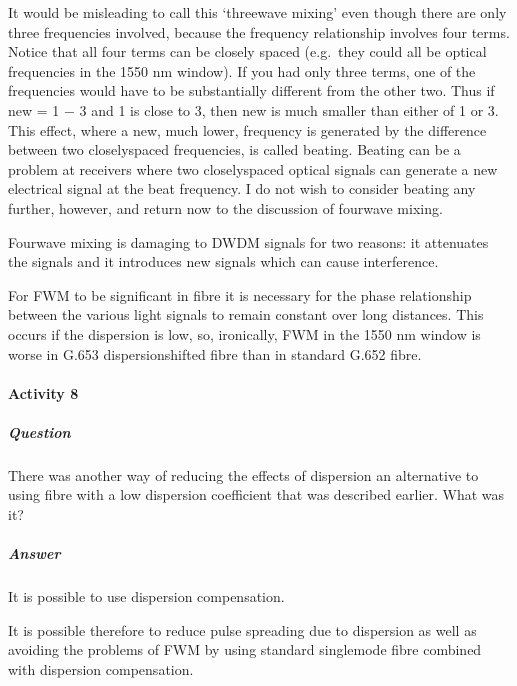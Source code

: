 \documentclass[letterpaper,10pt,english]{sphinxmanual}
\begin{document}
It would be misleading to call this ‘three\sphinxhyphen{}wave mixing’ even though there are only three frequencies involved, because the frequency relationship involves four terms. Notice that all four terms can be closely spaced (e.g. they could all be optical frequencies in the 1550 nm window). If you had only three terms, one of the frequencies would have to be substantially different from the other two. Thus if new = 1 − 3 and 1 is close to 3, then new is much smaller than
either of 1 or 3. This effect, where a new, much lower, frequency is generated by the difference between two closely\sphinxhyphen{}spaced frequencies, is called beating. Beating can be a problem at receivers where two closely\sphinxhyphen{}spaced optical signals can generate a new electrical signal at the beat frequency. I do not wish to consider beating any further, however, and return now to the discussion of four\sphinxhyphen{}wave mixing.

Four\sphinxhyphen{}wave mixing is damaging to DWDM signals for two reasons: it attenuates the signals and it introduces new signals which can cause interference.

For FWM to be significant in fibre it is necessary for the phase relationship between the various light signals to remain constant over long distances. This occurs if the dispersion is low, so, ironically, FWM in the 1550 nm window is worse in G.653 dispersion\sphinxhyphen{}shifted fibre than in standard G.652 fibre.


\paragraph{Activity 8}
\label{\detokenize{content/session_00/Part_00_02:Activity-8}}

\subparagraph{Question}
\label{\detokenize{content/session_00/Part_00_02:id23}}
There was another way of reducing the effects of dispersion \textendash{} an alternative to using fibre with a low dispersion coefficient \textendash{} that was described earlier. What was it?


\subparagraph{Answer}
\label{\detokenize{content/session_00/Part_00_02:id24}}
It is possible to use dispersion compensation.

It is possible therefore to reduce pulse spreading due to dispersion as well as avoiding the problems of FWM by using standard single\sphinxhyphen{}mode fibre combined with dispersion compensation.
\end{document}

